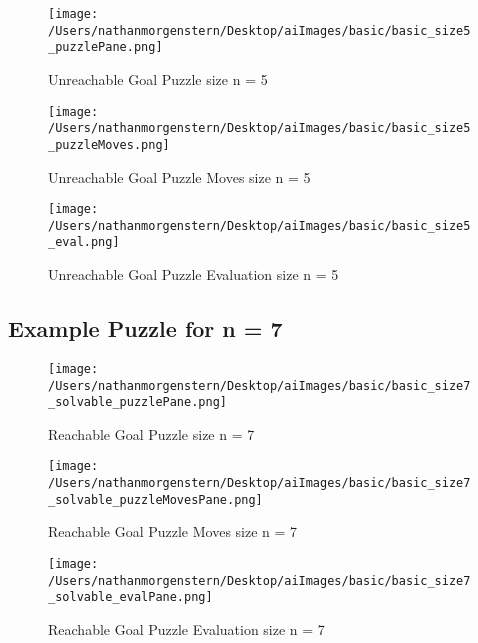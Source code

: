 \documentclass{report}
\begin{document}
	\begin{figure}[H]
	\centering
	\texttt{[image: /Users/nathanmorgenstern/Desktop/aiImages/basic/basic\_size5\_puzzlePane.png]}
	\caption{Unreachable Goal Puzzle size n = 5}
	\label{fig: Basic Evaluation n = 5 unreachable goal puzzle }
	\end{figure}
	
	\begin{figure}[H]
	\centering
	\texttt{[image: /Users/nathanmorgenstern/Desktop/aiImages/basic/basic\_size5\_puzzleMoves.png]}
	\caption{Unreachable Goal Puzzle Moves size n = 5}
	\label{fig: Basic Evaluation n = 5 unreachable goal puzzle moves}
	\end{figure}
	
	\begin{figure}[H]
	\centering
	\texttt{[image: /Users/nathanmorgenstern/Desktop/aiImages/basic/basic\_size5\_eval.png]}
	\caption{Unreachable Goal Puzzle Evaluation size n = 5}
	\label{fig: Basic Evaluation n = 5 unreachable goal puzzle evaluation}
	\end{figure}
	
	
\subsection{Example Puzzle for n = 7}

	\begin{figure}[H]
	\centering
	\texttt{[image: /Users/nathanmorgenstern/Desktop/aiImages/basic/basic\_size7\_solvable\_puzzlePane.png]}
	\caption{Reachable Goal Puzzle size n = 7}
	\label{fig: Basic Evaluation n = 7 reachable goal puzzle }
	\end{figure}
	
	\begin{figure}[H]
	\centering
	\texttt{[image: /Users/nathanmorgenstern/Desktop/aiImages/basic/basic\_size7\_solvable\_puzzleMovesPane.png]}
	\caption{Reachable Goal Puzzle Moves size n = 7}
	\label{fig: Basic Evaluation n = 7 reachable goal puzzle moves}
	\end{figure}
	
	\begin{figure}[H]
	\centering
	\texttt{[image: /Users/nathanmorgenstern/Desktop/aiImages/basic/basic\_size7\_solvable\_evalPane.png]}
	\caption{Reachable Goal Puzzle Evaluation size n = 7}
	\label{fig: Basic Evaluation n = 7 reachable goal puzzle evaluation}
	\end{figure}
	
\end{document}
